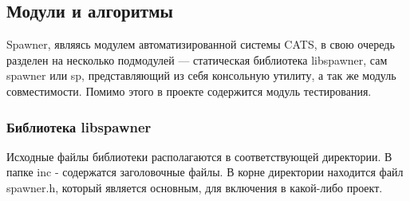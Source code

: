 \documentclass{imcs}
\begin{document}
\subsection{Модули и алгоритмы}

Spawner, являясь модулем автоматизированной системы CATS, в свою очередь разделен на несколько подмодулей — статическая библиотека libspawner, сам spawner или sp, представляющий из себя консольную утилиту, а так же модуль совместимости. Помимо этого в проекте содержится модуль тестирования.

\subsubsection{Библиотека libspawner}

Исходные файлы библиотеки располагаются в соответствующей директории.
В папке inc - содержатся заголовочные файлы. В корне директории находится файл spawner.h, который является основным, для включения в какой-либо проект.
\end{document}
